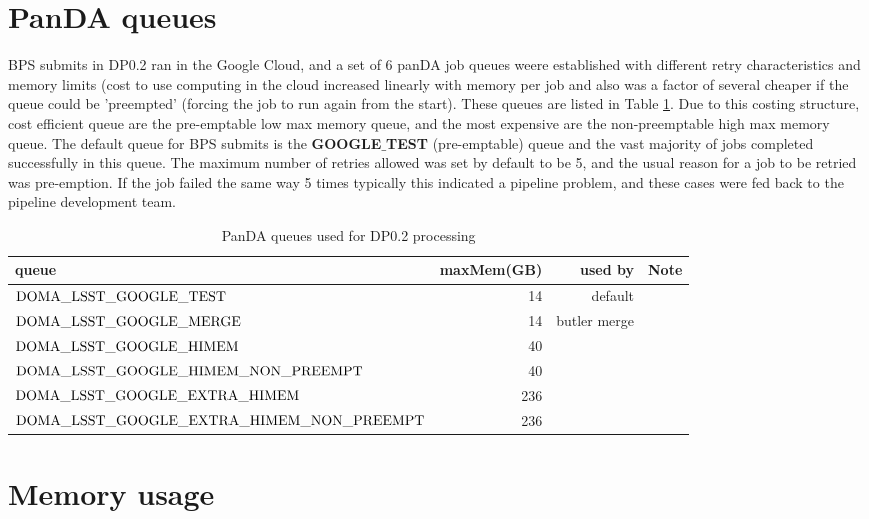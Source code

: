 \documentclass[OPS,authoryear,toc]{lsstdoc}
\begin{document}
\section{PanDA queues}
BPS submits in DP0.2 ran in the Google Cloud, and a set of 6 panDA job queues weere established with different retry characteristics and memory limits (cost
to use computing in the cloud increased linearly with memory per job and also
was a factor of several cheaper if the queue could be 'preempted' (forcing
the job to run again from the start).  These queues are listed in Table \ref{tab:queues}. Due to this costing structure, cost efficient queue are 
the pre-emptable low max memory queue, and the most expensive are the 
non-preemptable high max memory queue. The default queue for BPS submits 
is the {\bf GOOGLE$\_$TEST} (pre-emptable) queue and the vast majority 
of jobs completed successfully in this queue.  The maximum number of
retries allowed was set by default to be 5, and the usual reason for a 
job to be retried was pre-emption.  If the job failed the same way 5 times
typically this indicated a pipeline problem, and these cases were
fed back to the pipeline development team.


\begin{center}
\begin{table}[ht]
\caption{PanDA queues used for DP0.2 processing}
\begin{tabular} { |l|r|r|l|}
\hline
queue & maxMem(GB) & used by &  Note\\
\hline
$\rm DOMA\_LSST\_GOOGLE\_TEST$ & 14 & default &\\
$\rm DOMA\_LSST\_GOOGLE\_MERGE$ & 14 & butler merge &\\
$\rm DOMA\_LSST\_GOOGLE\_HIMEM$ & 40 &  &\\
$\rm DOMA\_LSST\_GOOGLE\_HIMEM\_NON\_PREEMPT$ & 40 & &\\
$\rm DOMA\_LSST\_GOOGLE\_EXTRA\_HIMEM$ & 236 &  &\\
$\rm DOMA\_LSST\_GOOGLE\_EXTRA\_HIMEM\_NON\_PREEMPT$ & 236 & &\\
\hline
\end{tabular}
\label{tab:queues}
\end{table}
\end{center}


\section{Memory usage}
\end{document}
